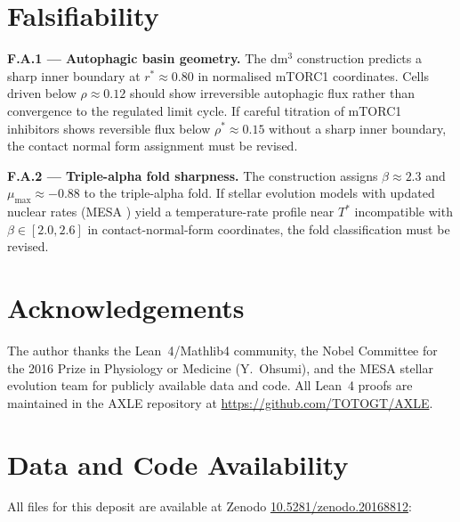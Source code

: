 \documentclass[12pt,a4paper]{article}
\begin{document}
\section{Falsifiability}
\label{sec:falsif}

\textbf{F.A.1 --- Autophagic basin geometry.}
The dm$^3$ construction predicts a sharp inner boundary at
$r^* \approx 0.80$ in normalised mTORC1 coordinates. Cells driven below
$\rho \approx 0.12$ should show irreversible autophagic flux rather than
convergence to the regulated limit cycle. If careful titration of mTORC1
inhibitors shows reversible flux below $\rho^* \approx 0.15$ without a
sharp inner boundary, the contact normal form assignment must be revised.

\textbf{F.A.2 --- Triple-alpha fold sharpness.}
The construction assigns $\beta \approx 2.3$ and $\mu_{\max} \approx -0.88$
to the triple-alpha fold. If stellar evolution models with updated nuclear
rates (MESA \cite{Paxton2011}) yield a temperature-rate profile near $T^*$
incompatible with $\beta \in [2.0, 2.6]$ in contact-normal-form coordinates,
the fold classification must be revised.

\section*{Acknowledgements}

The author thanks the Lean~4/Mathlib4 community, the Nobel Committee for
the 2016 Prize in Physiology or Medicine (Y.~Ohsumi), and the MESA stellar
evolution team for publicly available data and code. All Lean~4 proofs are
maintained in the AXLE repository \cite{AXLE2026} at
\url{https://github.com/TOTOGT/AXLE}.

\section*{Data and Code Availability}

All files for this deposit are available at Zenodo
\href{https://doi.org/10.5281/zenodo.20168812}{10.5281/zenodo.20168812}:
\end{document}
